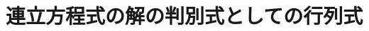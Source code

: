 \documentclass[../../../topic_linear-algebra]{subfiles}
\begin{document}
\sectionline
\section{連立方程式の解の判別式としての行列式}
\end{document}
